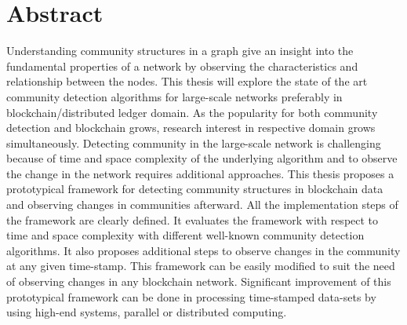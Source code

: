 \chapter*{Abstract}
\label{cha:abstract}

Understanding community structures in a graph give an insight into the fundamental properties of a network by observing the characteristics and relationship between the nodes. This thesis will explore the state of the art community detection algorithms for large-scale networks preferably in blockchain/distributed ledger domain. As the popularity for both community detection and blockchain grows, research interest in respective domain grows simultaneously. Detecting community in the large-scale network is challenging because of time and space complexity of the underlying algorithm and to observe the change in the network requires additional approaches. This thesis proposes a prototypical framework for detecting community structures in blockchain data and observing changes in communities afterward. All the implementation steps of the framework are clearly defined. It evaluates the framework with respect to time and space complexity with different well-known community detection algorithms. It also proposes additional steps to observe changes in the community at any given time-stamp. This framework can be easily modified to suit the need of observing changes in any blockchain network. Significant improvement of this prototypical framework can be done in processing time-stamped data-sets by using high-end systems, parallel or distributed computing.

